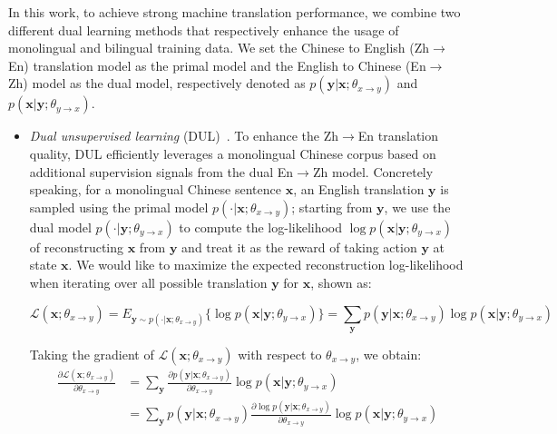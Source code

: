 \documentclass[a4paper]{article}
\begin{document}
\begin{CJK*}{UTF8}{gbsn}
In this work, to achieve strong machine translation performance, we combine two different dual learning methods that respectively enhance the usage of monolingual and bilingual training data. We set the Chinese to English (Zh$\rightarrow$En) translation model as the primal model and the English to Chinese (En$\rightarrow$Zh) model as the dual model, respectively denoted as $p(\mathbf{y}|\mathbf{x};\theta_{x\rightarrow y})$ and $p(\mathbf{x}|\mathbf{y};\theta_{y\rightarrow x})$.

\begin{itemize}
\item \emph{Dual unsupervised learning} (DUL)~\cite{dualNMT}. To enhance the Zh$\rightarrow$En translation quality, DUL efficiently leverages a monolingual Chinese corpus based on additional supervision signals from the dual En$\rightarrow$Zh model. Concretely speaking, for a monolingual Chinese sentence $\mathbf{x}$, an English translation $\mathbf{y}$ is sampled using the primal model $p(\cdot|\mathbf{x};\theta_{x\rightarrow y})$; starting from $\mathbf{y}$, we use the dual model $p(\cdot|\mathbf{y};\theta_{y\rightarrow x})$ to compute the log-likelihood $\log p(\mathbf{x}|\mathbf{y};\theta_{y\rightarrow x})$ of reconstructing $\mathbf{x}$ from $\mathbf{y}$ and treat it as the reward of taking action $\mathbf{y}$ at state $\mathbf{x}$. We would like to maximize the expected reconstruction log-likelihood when iterating over all possible translation $\mathbf{y}$ for $\mathbf{x}$, shown as:

\begin{equation}
\mathcal{L}(\mathbf{x};\theta_{x\rightarrow y})=E_{\mathbf{y}\sim p(\cdot|\mathbf{x};\theta_{x\rightarrow y})}\bigl\{\log p(\mathbf{x}|\mathbf{y};\theta_{y\rightarrow x})\bigr\}=\sum_{\mathbf{y}}p(\mathbf{y}|\mathbf{x};\theta_{x\rightarrow y})\log p(\mathbf{x}|\mathbf{y};\theta_{y\rightarrow x})
\end{equation}

Taking the gradient of $\mathcal{L}(\mathbf{x};\theta_{x\rightarrow y})$ with respect to $\theta_{x\rightarrow y}$, we obtain:
\begin{equation}
\begin{aligned}
\frac{\partial \mathcal{L}(\mathbf{x};\theta_{x\rightarrow y})}{\partial \theta_{x\rightarrow y}}&=\sum_{\mathbf{y}}\frac{\partial p(\mathbf{y}|\mathbf{x};\theta_{x\rightarrow y})}{\partial \theta_{x\rightarrow y}}\log p(\mathbf{x}|\mathbf{y};\theta_{y\rightarrow x})\\
&= \sum_{\mathbf{y}}p(\mathbf{y}|\mathbf{x};\theta_{x\rightarrow y})\frac{\partial \log p(\mathbf{y}|\mathbf{x};\theta_{x\rightarrow y})}{\partial \theta_{x\rightarrow y}}\log p(\mathbf{x}|\mathbf{y};\theta_{y\rightarrow x})
\end{aligned}
\end{equation}


\end{itemize}
\end{CJK*}
\end{document}

